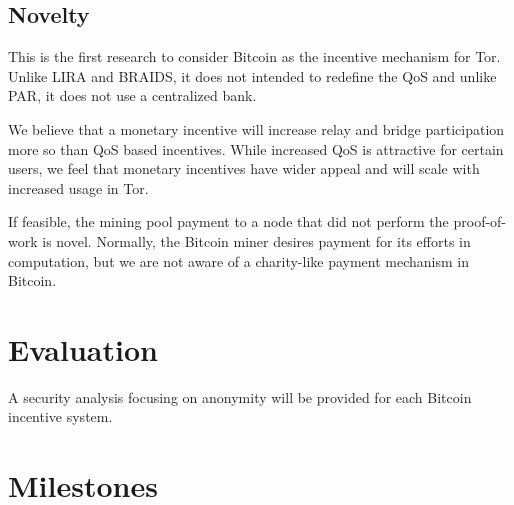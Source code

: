 \documentclass[letterpaper]{article}
\begin{document}
\subsection{Novelty}\label{sec:novelty}
This is the first research to consider Bitcoin as the incentive
mechanism for Tor.  Unlike LIRA and BRAIDS, it does not intended to
redefine the QoS and unlike PAR, it does not use a centralized bank.

We believe that a monetary incentive will increase relay and bridge
participation more so than QoS based incentives.  While increased QoS
is attractive for certain users, we feel that monetary incentives
have wider appeal and will scale with increased usage in Tor.

If feasible, the mining pool payment to a node that did not perform
the proof-of-work is novel.  Normally, the Bitcoin miner desires
payment for its efforts in computation, but we are not aware of a
charity-like payment mechanism in Bitcoin.




\section{Evaluation}\label{sec:evaluation}
A security analysis focusing on anonymity will be provided for each
Bitcoin incentive system.
\section{Milestones}\label{sec:milestones}







\end{document}
